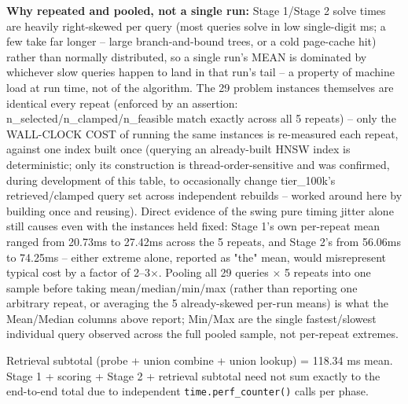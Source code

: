 \begin{table}[t]
\begin{threeparttable}
\begin{tablenotes}
\item[b] \textbf{Why repeated and pooled, not a single run:} Stage 1/Stage 2 solve times are heavily right-skewed per query (most queries solve in low single-digit ms; a few take far longer -- large branch-and-bound trees, or a cold page-cache hit) rather than normally distributed, so a single run's MEAN is dominated by whichever slow queries happen to land in that run's tail -- a property of machine load at run time, not of the algorithm. The 29 problem instances themselves are identical every repeat (enforced by an assertion: n\_selected/n\_clamped/n\_feasible match exactly across all 5 repeats) -- only the WALL-CLOCK COST of running the same instances is re-measured each repeat, against one index built once (querying an already-built HNSW index is deterministic; only its construction is thread-order-sensitive and was confirmed, during development of this table, to occasionally change tier\_100k's retrieved/clamped query set across independent rebuilds -- worked around here by building once and reusing). Direct evidence of the swing pure timing jitter alone still causes even with the instances held fixed: Stage 1's own per-repeat mean ranged from 20.73ms to 27.42ms across the 5 repeats, and Stage 2's from 56.06ms to 74.25ms -- either extreme alone, reported as "the" mean, would misrepresent typical cost by a factor of 2--3$\times$. Pooling all 29 queries $\times$ 5 repeats into one sample before taking mean/median/min/max (rather than reporting one arbitrary repeat, or averaging the 5 already-skewed per-run means) is what the Mean/Median columns above report; Min/Max are the single fastest/slowest individual query observed across the full pooled sample, not per-repeat extremes.
\item[c] Retrieval subtotal (probe + union combine + union lookup) = 118.34 ms mean. Stage 1 + scoring + Stage 2 + retrieval subtotal need not sum exactly to the end-to-end total due to independent \texttt{time.perf\_counter()} calls per phase.
\end{tablenotes}
\end{threeparttable}
\end{table}
